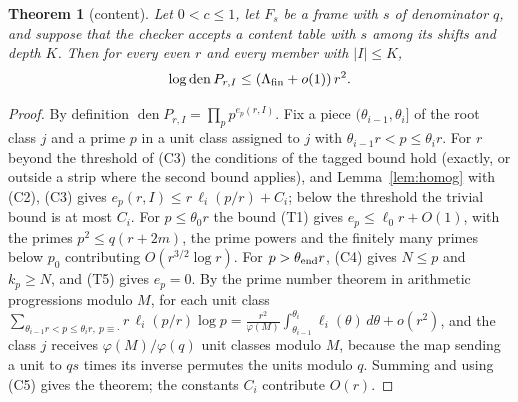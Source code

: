 \documentclass[11pt]{amsart}
\newtheorem{theorem}{Theorem}[section]
\theoremstyle{definition}
\theoremstyle{remark}
\numberwithin{equation}{section}
\newcommand{\den}{\operatorname{den}}
\begin{document}
\begin{theorem}[content]\label{thm:content}
Let $0<c\le1$, let $F_s$ be a frame with $s$ of denominator $q$, and suppose that the checker accepts a content table with
$s$ among its shifts and depth $K$. Then for every even $r$ and every member with $|I|\le K$,
\[
 \log\den P_{r,I}\le(\Lambda_{\rm fin}+o(1))\,r^2 .
\]
\end{theorem}
\begin{proof}
By definition $\den P_{r,I}=\prod_pp^{e_p(r,I)}$. Fix a piece $(\theta_{i-1},\theta_i]$ of the root class $j$ and a prime $p$ in a
unit class assigned to $j$ with $\theta_{i-1}r<p\le\theta_ir$. For $r$ beyond the threshold of (C3) the conditions of the
tagged bound hold (exactly, or outside a strip where the second bound applies), and Lemma~\ref{lem:homog} with (C2), (C3)
gives $e_p(r,I)\le r\,\ell_i(p/r)+C_i$; below the threshold the trivial bound is at most $C_i$. For $p\le\theta_0r$ the bound
(T1) gives $e_p\le\ell_0r+O(1)$, with the primes $p^2\le q(r+2m)$, the prime powers and the finitely many primes below
$p_0$ contributing $O(r^{3/2}\log r)$. For $p>\theta_{\rm end}r$, (C4) gives $N\le p$ and $k_p\ge N$, and (T5) gives $e_p=0$. By
the prime number theorem in arithmetic progressions modulo $M$, for each unit class
$\sum_{\theta_{i-1}r<p\le\theta_ir,\ p\equiv\cdot}r\,\ell_i(p/r)\log p=\frac{r^2}{\varphi(M)}\int_{\theta_{i-1}}^{\theta_i}\ell_i(\theta)\,d\theta+o(r^2)$,
and the class $j$ receives $\varphi(M)/\varphi(q)$ unit classes modulo $M$, because the map sending a unit to $qs$ times
its inverse permutes the units modulo $q$. Summing and using (C5) gives the theorem; the constants $C_i$ contribute $O(r)$.
\end{proof}
\end{document}
